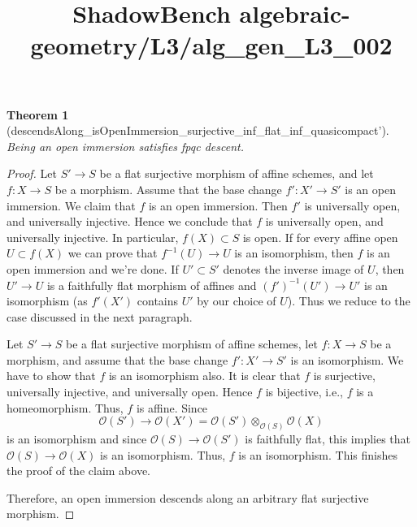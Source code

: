 \documentclass{article}
\title{ShadowBench algebraic-geometry/L3/alg\_gen\_L3\_002}
\newtheorem{theorem}{Theorem}
\begin{document}
\maketitle

\begin{theorem}[descendsAlong_isOpenImmersion_surjective_inf_flat_inf_quasicompact']
     Being an open immersion satisfies fpqc descent.
\end{theorem}
\begin{proof}
    Let $S' \to S$ be a flat surjective morphism of affine schemes, and let $f:X \to S$ be a morphism. Assume that the base change $f':X' \to S'$ is an open immersion. We claim that $f$ is an open immersion. Then $f'$ is universally open, and universally injective. Hence we conclude that $f$ is universally open, and universally injective. In particular, $f(X) \subset S$ is open. If for every affine open $U \subset f(X)$ we can prove that $f^{-1}(U) \to U$ is an isomorphism, then $f$ is an open immersion and we're done. If $U' \subset S'$ denotes the inverse image of $U$, then $U' \to U$ is a faithfully flat morphism of affines and $(f')^{-1}(U') \to U'$ is an isomorphism (as $f'(X')$ contains $U'$ by our choice of $U$). Thus we reduce to the case discussed in the next paragraph.

    Let $S' \to S$ be a flat surjective morphism of affine schemes, let $f:X \to S$ be a morphism, and assume that the base change $f':X' \to S'$ is an isomorphism. We have to show that $f$ is an isomorphism also. It is clear that $f$ is surjective, universally injective, and universally open. Hence $f$ is bijective, i.e., $f$ is a homeomorphism. Thus, $f$ is affine. Since 
    \[
        \mathcal{O}(S') \to \mathcal{O}(X') = \mathcal{O}(S') \otimes_{\mathcal{O}(S)} \mathcal{O}(X)
    \]
    is an isomorphism and since $\mathcal{O}(S) \to \mathcal{O}(S')$ is faithfully flat, this implies that $\mathcal{O}(S) \to \mathcal{O}(X)$ is an isomorphism. Thus, $f$ is an isomorphism. This finishes the proof of the claim above. 

    Therefore, an open immersion descends along an arbitrary flat surjective morphism.
\end{proof}
\end{document}
